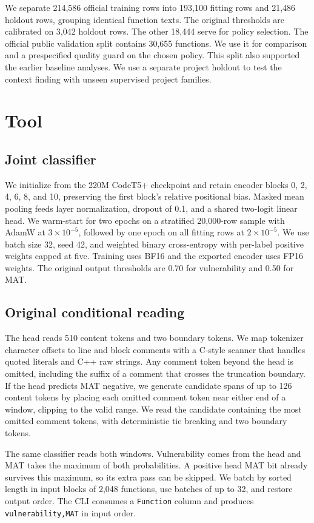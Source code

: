 \documentclass[10pt,conference]{IEEEtran}
\begin{document}
We separate 214,586 official training rows into 193,100 fitting rows and 21,486 holdout rows, grouping identical function texts. The original thresholds are calibrated on 3,042 holdout rows. The other 18,444 serve for policy selection. The official public validation split contains 30,655 functions. We use it for comparison and a prespecified quality guard on the chosen policy. This split also supported the earlier baseline analyses. We use a separate project holdout to test the context finding with unseen supervised project families.

\section{Tool}
\subsection{Joint classifier}
We initialize from the 220M CodeT5+ checkpoint \cite{codet5p} and retain encoder blocks 0, 2, 4, 6, 8, and 10, preserving the first block's relative positional bias. Masked mean pooling feeds layer normalization, dropout of 0.1, and a shared two-logit linear head. We warm-start for two epochs on a stratified 20,000-row sample with AdamW at $3 \times 10^{-5}$, followed by one epoch on all fitting rows at $2 \times 10^{-5}$. We use batch size 32, seed 42, and weighted binary cross-entropy with per-label positive weights capped at five. Training uses BF16 and the exported encoder uses FP16 weights. The original output thresholds are 0.70 for vulnerability and 0.50 for MAT.

\subsection{Original conditional reading}
The head reads 510 content tokens and two boundary tokens. We map tokenizer character offsets to line and block comments with a C-style scanner that handles quoted literals and C++ raw strings. Any comment token beyond the head is omitted, including the suffix of a comment that crosses the truncation boundary. If the head predicts MAT negative, we generate candidate spans of up to 126 content tokens by placing each omitted comment token near either end of a window, clipping to the valid range. We read the candidate containing the most omitted comment tokens, with deterministic tie breaking and two boundary tokens.

The same classifier reads both windows. Vulnerability comes from the head and MAT takes the maximum of both probabilities. A positive head MAT bit already survives this maximum, so its extra pass can be skipped. We batch by sorted length in input blocks of 2,048 functions, use batches of up to 32, and restore output order. The CLI consumes a \texttt{Function} column and produces \texttt{vulnerability,MAT} in input order.
\end{document}
